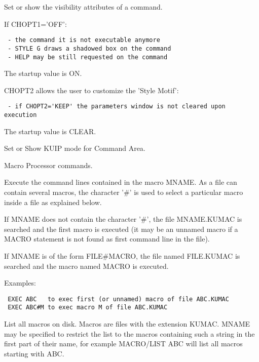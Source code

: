 \BEGARG
{}
\ENDARG
\BEGTEXT
Set or show the visibility attributes of a command.

If CHOPT1='OFF':
\begin{verbatim}
 - the command it is not executable anymore
 - STYLE G draws a shadowed box on the command
 - HELP may be still requested on the command
\end{verbatim}
The startup value is ON.

CHOPT2 allows the user to customize the 'Style Motif':
\begin{verbatim}
 - if CHOPT2='KEEP' the parameters window is not cleared upon execution
\end{verbatim}
The startup value is CLEAR.
\ENDTEXT

\BEGARG
{}
\ENDARG
\BEGTEXT
Set or Show KUIP mode for Command Area.
\ENDTEXT


\BEGTEXT
Macro Processor commands.
\ENDTEXT

\BEGARG
{}
\ENDARG
\BEGTEXT
Execute the command lines contained in the macro MNAME.
As a file can contain several macros, the character '\#' is
used to select a particular macro inside a file as explained below.

If MNAME does not contain the character '\#', the file MNAME.KUMAC
is searched and the first macro is executed (it may be an unnamed
macro if a MACRO statement is not found as first command line in the file).

If MNAME is of the form FILE\#MACRO, the file named FILE.KUMAC is searched
and the macro named MACRO is executed.

Examples:
\begin{verbatim}
 EXEC ABC   to exec first (or unnamed) macro of file ABC.KUMAC
 EXEC ABC#M to exec macro M of file ABC.KUMAC
\end{verbatim}
\ENDTEXT

\BEGARG
{}
\ENDARG
\BEGTEXT
List all macros on disk.
Macros are files with the extension KUMAC.
MNAME may be specified to restrict the list to the macros
containing such a string in the first part of their name,
for example MACRO/LIST ABC will list all macros starting with ABC.
\ENDTEXT


